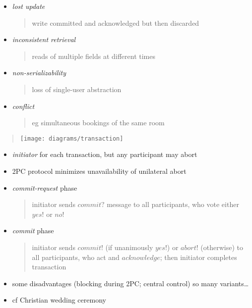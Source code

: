 \documentclass{sepslide-soa-faked} %
\begin{document}
\begin{slide}
\begin{itemize}
\item \emph{lost update}
\begin{quote}
write committed and acknowledged but then discarded
\end{quote}
\item \emph{inconsistent retrieval}
\begin{quote}
reads of multiple fields at different times
\end{quote}
\item \emph{non-serializability}
\begin{quote}
loss of single-user abstraction
\end{quote}
\item \emph{conflict}
\begin{quote}
eg simultaneous bookings of the same room
\end{quote}
\end{itemize}
\end{slide}

\begin{slide}
\begin{quote}
\texttt{[image: diagrams/transaction]}
\end{quote}
\end{slide}

\begin{slide}
\begin{itemize}
\item \emph{initiator} for each transaction, but any participant may abort 
\item 2PC protocol minimizes unavailability of unilateral abort 
\item \emph{commit-request} phase
\begin{quote}
initiator sends $commit?$ message to all participants,
who vote either $yes!$ or $no!$
\end{quote}
\item \emph{commit} phase
\begin{quote}
initiator sends $commit!$ (if unanimously $yes!$)
or $abort!$ (otherwise)
to all participants, who act and $acknowledge$;
then initiator completes transaction
\end{quote}
\item some disadvantages (blocking during 2PC; central control) so many variants\ldots
\item cf Christian wedding ceremony
\end{itemize}
\end{slide}
\end{document}
